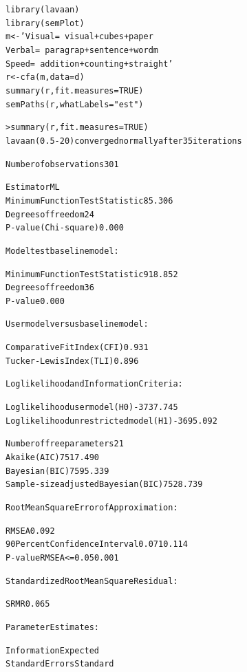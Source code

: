 \begin{alltt}
library(lavaan)
library(semPlot)
m <- 'Visual =~ visual + cubes + paper \hfill {}
      Verbal =~ paragrap + sentence + wordm
      Speed  =~ addition + counting + straight'
r <- cfa(m, data = d) \hfill {}
summary(r, fit.measures = TRUE) \hfill {}
semPaths(r, whatLabels = "est") \hfill {}
\end{alltt}
\begin{alltt}\small
> summary(r, fit.measures = TRUE)
lavaan (0.5-20) converged normally after  35 iterations

  Number of observations                           301

  Estimator                                         ML
  Minimum Function Test Statistic               85.306
  Degrees of freedom                                24
  P-value (Chi-square)                           0.000

Model test baseline model:

  Minimum Function Test Statistic              918.852
  Degrees of freedom                                36
  P-value                                        0.000

User model versus baseline model:

  Comparative Fit Index (CFI)                    0.931 \hfill {}
  Tucker-Lewis Index (TLI)                       0.896

Loglikelihood and Information Criteria:

  Loglikelihood user model (H0)              -3737.745
  Loglikelihood unrestricted model (H1)      -3695.092

  Number of free parameters                         21
  Akaike (AIC)                                7517.490
  Bayesian (BIC)                              7595.339
  Sample-size adjusted Bayesian (BIC)         7528.739

Root Mean Square Error of Approximation:

  RMSEA                                          0.092 \hfill {}
  90 Percent Confidence Interval          0.071  0.114
  P-value RMSEA <= 0.05                          0.001

Standardized Root Mean Square Residual:

  SRMR                                           0.065 \hfill {}

Parameter Estimates:

  Information                                 Expected
  Standard Errors                             Standard


\end{alltt}
